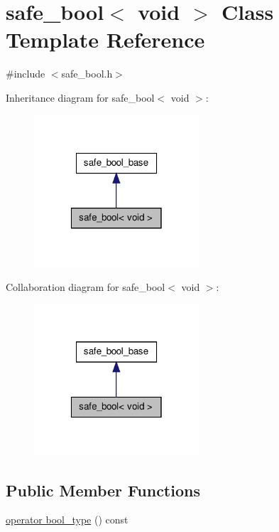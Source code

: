 \hypertarget{classsafe__bool_3_01void_01_4}{\section{safe\-\_\-bool$<$ void $>$ Class Template Reference}
\label{classsafe__bool_3_01void_01_4}
}


{\ttfamily \#include $<$safe\-\_\-bool.\-h$>$}



Inheritance diagram for safe\-\_\-bool$<$ void $>$\-:\nopagebreak
\begin{figure}[H]
\begin{center}
\leavevmode
\includegraphics[width=174pt]{classsafe__bool_3_01void_01_4__inherit__graph}
\end{center}
\end{figure}


Collaboration diagram for safe\-\_\-bool$<$ void $>$\-:\nopagebreak
\begin{figure}[H]
\begin{center}
\leavevmode
\includegraphics[width=174pt]{classsafe__bool_3_01void_01_4__coll__graph}
\end{center}
\end{figure}
\subsection*{Public Member Functions}
\begin{DoxyCompactItemize}
\item 
\hyperlink{classsafe__bool_3_01void_01_4_a5e5cf04a8b66586974860714de14c77b}{operator bool\-\_\-type} () const 
\end{DoxyCompactItemize}
